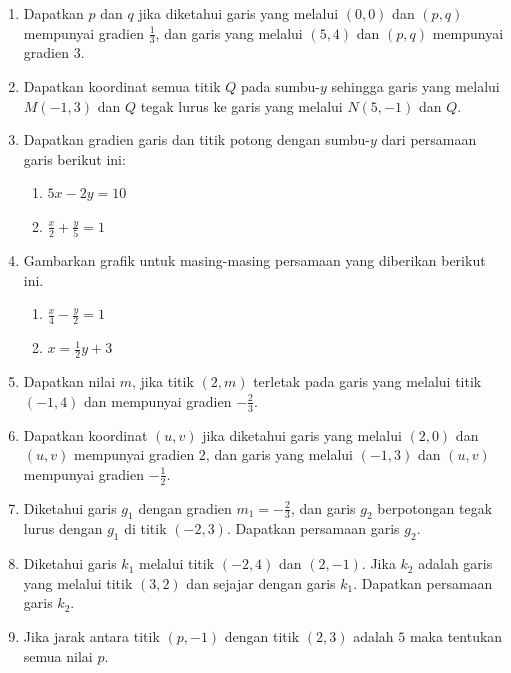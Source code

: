 \documentclass[12pt]{article}
\begin{document}
\begin{enumerate}
    \item Dapatkan $p$ dan $q$ jika diketahui garis yang melalui $(0,0)$ dan $(p,q)$ mempunyai gradien $\frac{1}{3}$, dan garis yang melalui $(5,4)$ dan $(p,q)$ mempunyai gradien $3$.
    
    \item Dapatkan koordinat semua titik $Q$ pada sumbu-$y$ sehingga garis yang melalui $M(-1,3)$ dan $Q$ tegak lurus ke garis yang melalui $N(5,-1)$ dan $Q$.
    
    \item Dapatkan gradien garis dan titik potong dengan sumbu-$y$ dari persamaan garis berikut ini:
    \begin{enumerate}
        \item $5x - 2y = 10$
        \item $\displaystyle \frac{x}{2} + \frac{y}{5} = 1$
    \end{enumerate}
    
    \item Gambarkan grafik untuk masing-masing persamaan yang diberikan berikut ini.
    \begin{enumerate}
        \item $\displaystyle \frac{x}{4} - \frac{y}{2} = 1$
        \item $\displaystyle x = \frac{1}{2}y + 3$
    \end{enumerate}
    
    \item Dapatkan nilai $m$, jika titik $(2, m)$ terletak pada garis yang melalui titik $(-1, 4)$ dan mempunyai gradien $-\frac{2}{3}$.
    
    \item Dapatkan koordinat $(u,v)$ jika diketahui garis yang melalui $(2,0)$ dan $(u,v)$ mempunyai gradien $2$, dan garis yang melalui $(-1,3)$ dan $(u,v)$ mempunyai gradien $-\frac{1}{2}$.
    
    \item Diketahui garis $g_1$ dengan gradien $m_1 = -\frac{2}{3}$, dan garis $g_2$ berpotongan tegak lurus dengan $g_1$ di titik $(-2, 3)$. Dapatkan persamaan garis $g_2$.
    
    \item Diketahui garis $k_1$ melalui titik $(-2, 4)$ dan $(2, -1)$. Jika $k_2$ adalah garis yang melalui titik $(3, 2)$ dan sejajar dengan garis $k_1$. Dapatkan persamaan garis $k_2$.
    
    \item Jika jarak antara titik $(p, -1)$ dengan titik $(2, 3)$ adalah $5$ maka tentukan semua nilai $p$.
    

\end{enumerate}
\end{document}
